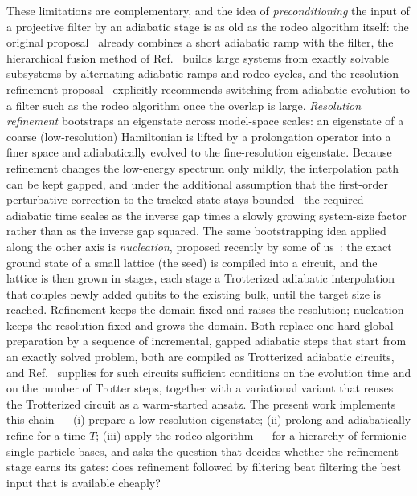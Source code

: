\documentclass[
  aps,            %
  prc,            %
  reprint,        %
  superscriptaddress,
  floatfix,
  nofootinbib
]{revtex4-2}
\begin{document}
These limitations are complementary, and the idea of \emph{preconditioning} the
input of a projective filter by an adiabatic stage is as old as the rodeo
algorithm itself: the original proposal~\cite{Choi2021} already combines a
short adiabatic ramp with the filter, the hierarchical fusion method of
Ref.~\cite{Patkowski2025fusion} builds large systems from exactly solvable
subsystems by alternating adiabatic ramps and rodeo cycles, and the
resolution-refinement proposal~\cite{Bogner2026} explicitly recommends
switching from adiabatic evolution to a filter such as the rodeo algorithm once
the overlap is large.  \emph{Resolution refinement} bootstraps an eigenstate
across model-space scales: an eigenstate of a coarse (low-resolution)
Hamiltonian is lifted by a prolongation operator into a finer space and
adiabatically evolved to the fine-resolution eigenstate.  Because refinement
changes the low-energy spectrum only mildly, the interpolation path can be
kept gapped, and under the additional assumption that the first-order
perturbative correction to the tracked state stays bounded~\cite{Bogner2026}
the required adiabatic time scales as the inverse gap times a slowly growing
system-size factor rather than as the inverse gap squared.  The same
bootstrapping idea applied along the other axis is \emph{nucleation}, proposed
recently by some of us~\cite{Sadia2026}: the exact ground state of a small
lattice (the seed) is compiled into a circuit, and the lattice is then grown
in stages, each stage a Trotterized adiabatic interpolation that couples newly
added qubits to the existing bulk, until the target size is reached.
Refinement keeps the domain fixed and raises the resolution; nucleation keeps
the resolution fixed and grows the domain.  Both replace one hard global
preparation by a sequence of incremental, gapped adiabatic steps that start
from an exactly solved problem, both are compiled as Trotterized adiabatic
circuits,
and Ref.~\cite{Sadia2026} supplies for such circuits sufficient conditions on
the evolution time and on the number of Trotter steps, together with a
variational variant that reuses the Trotterized circuit as a warm-started
ansatz.  The present work
implements this chain --- (i) prepare a low-resolution eigenstate; (ii) prolong
and adiabatically refine for a time $T$; (iii) apply the rodeo algorithm ---
for a hierarchy of fermionic single-particle bases, and asks the question that
decides whether the refinement stage earns its gates: does refinement followed
by filtering beat filtering the best input that is available cheaply?
\end{document}
